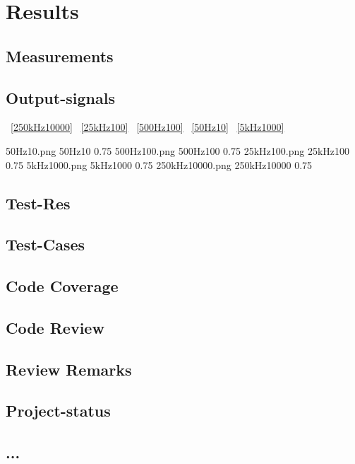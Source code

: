 	\chapter{Results}
	\label{cha:Results}
	\section{Measurements}
		\section{Output-signals}

		~\ref{250kHz10000}
		~\ref{25kHz100}
		~\ref{500Hz100}
		~\ref{50Hz10}
		~\ref{5kHz1000}


					{50Hz10.png}		{50Hz10}		{0.75\textwidth}
				{500Hz100.png}		{500Hz100}		{0.75\textwidth}
				{25kHz100.png}		{25kHz100}		{0.75\textwidth}
				{5kHz1000.png}		{5kHz1000}		{0.75\textwidth}
			{250kHz10000.png}	{250kHz10000}	{0.75\textwidth}
		
		
		\section{Test-Res}
		\section{Test-Cases}
		\section{Code Coverage}
		\section{Code Review}
		\section{Review Remarks}
		\section{Project-status}
		\section{ ... }
